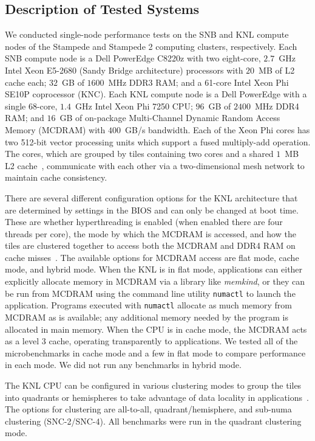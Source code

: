 \subsection{Description of Tested Systems}

We conducted single-node performance tests on the SNB and KNL compute nodes of the
Stampede and Stampede 2 computing clusters, respectively. Each SNB compute node
is a Dell PowerEdge C8220z with two eight-core, $2.7$~GHz Intel Xeon E5-2680 (Sandy Bridge
architecture) processors with $20$~MB of L2 cache each; $32$~GB of $1600$~MHz DDR3 RAM;
and a 61-core Intel Xeon Phi SE10P coprocessor (KNC). Each KNL compute node is
a Dell PowerEdge with a single 68-core, $1.4$~GHz Intel Xeon Phi 7250 CPU; $96$~GB of $2400$~MHz DDR4 RAM; and $16$~GB of on-package Multi-Channel
Dynamic Random Access Memory (MCDRAM) with $400$~GB/s bandwidth. Each of the Xeon Phi
cores has two 512-bit vector processing units which support a fused multiply-add
operation. The cores, which are grouped by tiles containing two cores and a shared $1$~MB
L2 cache~\cite{intel:xeonphi}, communicate with each other via a two-dimensional mesh
network to maintain cache consistency.

There are several different configuration options for the KNL architecture that are
determined by settings in the BIOS and can only be changed at boot time. These are whether
hyperthreading is enabled (when enabled there are four threads per core), the mode by
which the MCDRAM is accessed, and how the tiles are clustered together to access both the
MCDRAM and DDR4 RAM on cache misses~\cite{vladimirov:knlModes, asai:mcdramKnl}.  The
available options for MCDRAM access are flat mode, cache mode, and hybrid mode.  When the
KNL is in flat mode, applications can either explicitly allocate memory in MCDRAM via a
library like \textit{memkind}, or they can be run from MCDRAM using the command line
utility \texttt{numactl} to launch the application. Programs executed with
\texttt{numactl} allocate as much memory from MCDRAM as is available; any additional
memory needed by the program is allocated in main memory. When the CPU is in cache mode,
the MCDRAM acts as a level 3 cache, operating transparently to applications. We tested all
of the microbenchmarks in cache mode and a few in flat mode to compare performance in each
mode. We did not run any benchmarks in hybrid mode.

The KNL CPU can be configured in various clustering modes to group the tiles into
quadrants or hemispheres to take advantage of data locality in
applications~\cite{vladimirov:knlModes}. The options for clustering are all-to-all,
quadrant/hemisphere, and sub-numa clustering (SNC-2/SNC-4). All benchmarks were run in the
quadrant clustering mode.

